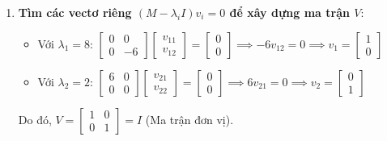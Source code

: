 \begin{conceptbox}
\begin{enumerate}[label=\textbf{Bước \arabic*:}, leftmargin=*]
    \item \textbf{Tìm các vectơ riêng $(M - \lambda_i I)v_i = 0$ để xây dựng ma trận $V$}:
    \begin{itemize}
        \item Với $\lambda_1 = 8$: $\begin{bmatrix} 0 & 0 \\ 0 & -6 \end{bmatrix} \begin{bmatrix} v_{11} \\ v_{12} \end{bmatrix} = \begin{bmatrix} 0 \\ 0 \end{bmatrix} \implies -6v_{12} = 0 \implies v_1 = \begin{bmatrix} 1 \\ 0 \end{bmatrix}$
        \item Với $\lambda_2 = 2$: $\begin{bmatrix} 6 & 0 \\ 0 & 0 \end{bmatrix} \begin{bmatrix} v_{21} \\ v_{22} \end{bmatrix} = \begin{bmatrix} 0 \\ 0 \end{bmatrix} \implies 6v_{21} = 0 \implies v_2 = \begin{bmatrix} 0 \\ 1 \end{bmatrix}$
    \end{itemize}
    Do đó, $V = \begin{bmatrix} 1 & 0 \\ 0 & 1 \end{bmatrix} = I$ (Ma trận đơn vị).
    

\end{enumerate}
\end{conceptbox}
